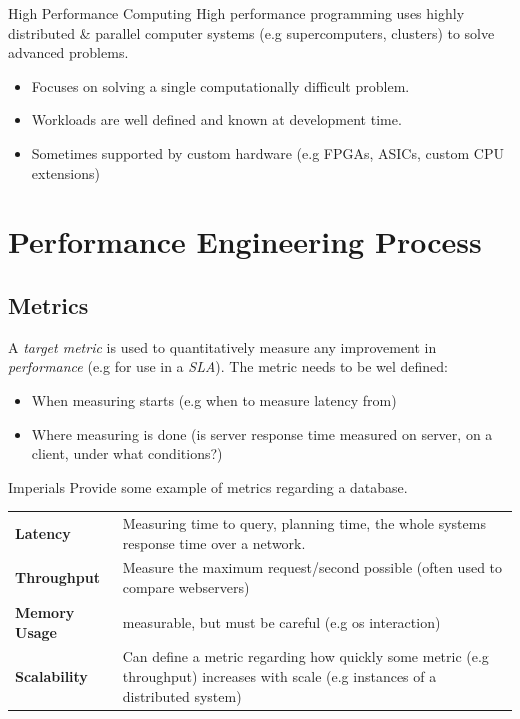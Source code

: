\begin{definitionbox}{High Performance Computing}
    High performance programming uses highly distributed \& parallel computer systems (e.g supercomputers, clusters) to solve advanced problems.
    \begin{itemize}
        \item Focuses on solving a single computationally difficult problem.
        \item Workloads are well defined and known at development time.
        \item Sometimes supported by custom hardware (e.g FPGAs, ASICs, custom CPU extensions)
    \end{itemize}
\end{definitionbox}

\section{Performance Engineering Process}
\subsection{Metrics}
A \textit{target metric} is used to quantitatively measure any improvement in \textit{performance} (e.g for use in a \textit{SLA}).
The metric needs to be wel defined:
\begin{itemize}
    \item When measuring starts (e.g when to measure latency from)
    \item Where measuring is done (is server response time measured on server, on a client, under what conditions?)    
\end{itemize}

\begin{examplebox}{Imperials}
    Provide some example of metrics regarding a database.
    \tcblower
    \begin{center}
        \begin{tabular}{l p{}}
            \textbf{Latency} & Measuring time to query, planning time, the whole systems response time over a network. \\
            \textbf{Throughput} & Measure the maximum request/second possible (often used to compare webservers) \\
            \textbf{Memory Usage} & measurable, but must be careful (e.g os interaction) \\
            \textbf{Scalability} & Can define a metric regarding how quickly some metric (e.g throughput) increases with scale (e.g instances of a distributed system) \\
        \end{tabular}
    \end{center}
\end{examplebox}    

